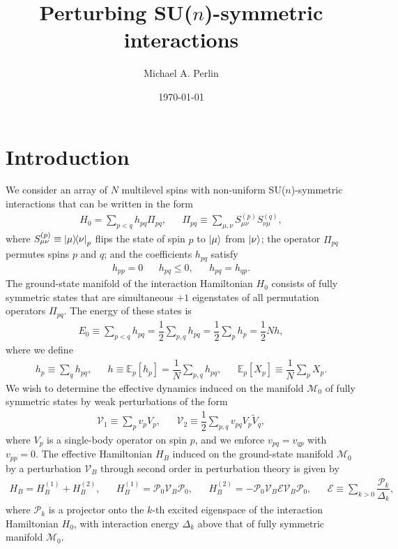 \documentclass[nofootinbib,notitlepage,11pt]{revtex4-2}
\newcommand{\f}[2]{\dfrac{#1}{#2}} %
\renewcommand{\sp}[1]{\left[#1\right]} %
\newcommand{\1}{\mathds{1}}
\newcommand{\E}{\mathcal{E}}
\newcommand{\M}{\mathcal{M}}
\renewcommand{\P}{\mathcal{P}}
\newcommand{\V}{\mathcal{V}}
\newcommand{\EE}{\mathbb{E}}
\begin{document}
\title{Perturbing SU($n$)-symmetric interactions}%
\author{Michael A. Perlin}%
\date{\today}

\maketitle

\tableofcontents

\section{Introduction}

We consider an array of $N$ multilevel spins with non-uniform
SU($n$)-symmetric interactions that can be written in the form
\begin{align}
  H_0 = \sum_{p<q} h_{pq} \Pi_{pq},
  &&
  \Pi_{pq} \equiv \sum_{\mu,\nu} S_{\mu\nu}^{(p)} S_{\nu\mu}^{(q)},
\end{align}
where $S_{\mu\nu}^{(p)}\equiv\op{\mu}{\nu}_p$ flips the state of spin
$p$ to $\ket\mu$ from $\ket\nu$; the operator $\Pi_{pq}$ permutes
spins $p$ and $q$; and the coefficients $h_{pq}$ satisfy
\begin{align}
  h_{pp} = 0
  &&
  h_{pq} \le 0,
  &&
  h_{pq} = h_{qp}.
\end{align}
The ground-state manifold of the interaction Hamiltonian $H_0$
consists of fully symmetric states that are simultaneous $+1$
eigenstates of all permutation operators $\Pi_{pq}$.  The energy of
these states is
\begin{align}
  E_0 \equiv \sum_{p<q} h_{pq} = \f12 \sum_{p,q} h_{pq}
  = \f12 \sum_p h_p = \f12 N h,
\end{align}
where we define
\begin{align}
  h_p \equiv \sum_q h_{pq},
  &&
  h \equiv \EE_p\sp{h_p} = \f1N \sum_{p,q} h_{pq},
  &&
  \EE_p\sp{X_p} \equiv \f1N \sum_p X_p.
\end{align}
We wish to determine the effective dynamics induced on the manifold
$\M_0$ of fully symmetric states by weak perturbations of the form
\begin{align}
  \V_1 \equiv \sum_p v_p V_p,
  &&
  \V_2 \equiv \f12 \sum_{p,q} v_{pq} V_p \tilde V_q,
  \label{eq:perturbations}
\end{align}
where $V_p$ is a single-body operator on spin $p$, and we enforce
$v_{pq}=v_{qp}$ with $v_{pp}=0$.  The effective Hamiltonian $H_B$
induced on the ground-state manifold $\M_0$ by a perturbation $\V_B$
through second order in perturbation theory is given
by\cite{bravyi2011schrieffer, perlin2019effective}
\begin{align}
  H_B = H_B^{(1)} + H_B^{(2)},
  &&
  H_B^{(1)} = \P_0 \V_B \P_0,
  &&
  H_B^{(2)} = - \P_0 \V_B \E \V_B \P_0,
  &&
  \E \equiv \sum_{k>0} \f{\P_k}{\Delta_k},
\end{align}
where $\P_k$ is a projector onto the $k$-th excited eigenspace of the
interaction Hamiltonian $H_0$, with interaction energy $\Delta_k$
above that of fully symmetric manifold $\M_0$.
\end{document}
